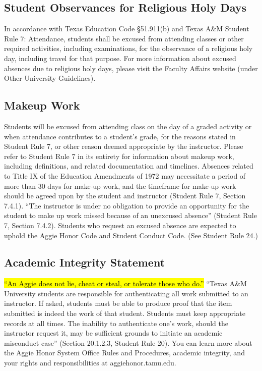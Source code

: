 \documentclass[11pt]{article}
\begin{document}
\subsection*{Student Observances for Religious Holy Days}
In accordance with Texas Education Code \S51.911(b) and Texas A\&M Student Rule 7: Attendance, students shall be excused from attending classes or other required activities, including examinations, for the observance of a religious holy day, including travel for that purpose. For more information about excused absences due to religious holy days, please visit the Faculty Affairs website (under Other University Guidelines).

\subsection*{Makeup Work}
Students will be excused from attending class on the day of a graded activity or when attendance contributes to a student’s grade, for the reasons stated in Student Rule 7, or other reason deemed appropriate by the instructor. Please refer to Student Rule 7 in its entirety for information about makeup work, including definitions, and related documentation and timelines.
Absences related to Title IX of the Education Amendments of 1972 may necessitate a period of more than 30 days for make-up work, and the timeframe for make-up work should be agreed upon by the student and instructor (Student Rule 7, Section 7.4.1).
``The instructor is under no obligation to provide an opportunity for the student to make up work missed because of an unexcused absence'' (Student Rule 7, Section 7.4.2).
Students who request an excused absence are expected to uphold the Aggie Honor Code and Student Conduct Code. (See Student Rule 24.)

\subsection*{Academic Integrity Statement}
\hl{``An Aggie does not lie, cheat or steal, or tolerate those who do.''}
``Texas A\&M University students are responsible for authenticating all work submitted to an instructor. If asked, students must be able to produce proof that the item submitted is indeed the work of that student. Students must keep appropriate records at all times. The inability to authenticate one’s work, should the instructor request it, may be sufficient grounds to initiate an academic misconduct case'' (Section 20.1.2.3, Student Rule 20).
You can learn more about the Aggie Honor System Office Rules and Procedures, academic integrity, and your rights and responsibilities at aggiehonor.tamu.edu.
\end{document}
